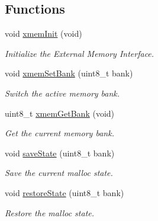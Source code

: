 \subsection*{Functions}
\begin{DoxyCompactItemize}
\item 
void \hyperlink{group__xmem_ga9744de3b2aca21a564b151e770ed7384}{xmem\-Init} (void)
\begin{DoxyCompactList}\small\item\em Initialize the External Memory Interface. \end{DoxyCompactList}\item 
void \hyperlink{group__xmem_ga619fa66b9f38be684f4331951fc91730}{xmem\-Set\-Bank} (uint8\-\_\-t bank)
\begin{DoxyCompactList}\small\item\em Switch the active memory bank. \end{DoxyCompactList}\item 
uint8\-\_\-t \hyperlink{group__xmem_ga575f63170f6fc636556f8d955cbd42cd}{xmem\-Get\-Bank} (void)
\begin{DoxyCompactList}\small\item\em Get the current memory bank. \end{DoxyCompactList}\item 
void \hyperlink{group__xmem_ga1b5d7ce361c908dce9af0faf79987124}{save\-State} (uint8\-\_\-t bank)
\begin{DoxyCompactList}\small\item\em Save the current malloc state. \end{DoxyCompactList}\item 
void \hyperlink{group__xmem_ga02e35ec14c8649b89dd91b5155031e2f}{restore\-State} (uint8\-\_\-t bank)
\begin{DoxyCompactList}\small\item\em Restore the malloc state. \end{DoxyCompactList}\end{DoxyCompactItemize}
